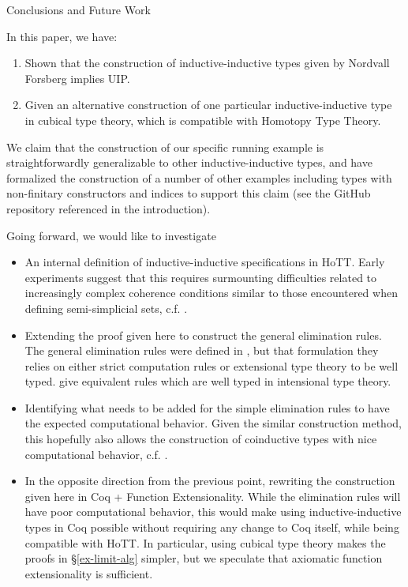 \documentclass[runningheads]{llncs}
\def\Forsberg/{Nordvall Forsberg}
\begin{document}
\begin{section}{Conclusions and Future Work}

In this paper, we have:
\begin{enumerate}
    \item Shown that the construction of inductive-inductive types given by \Forsberg/ implies UIP.
    \item Given an alternative construction of one particular inductive-inductive type in cubical type theory, which is compatible with Homotopy Type Theory.
\end{enumerate}

We claim that the construction of our specific running example is straightforwardly generalizable to other inductive-inductive types, and have formalized the construction of a number of other examples including types with non-finitary constructors and indices to support this claim (see the GitHub repository referenced in the introduction).

Going forward, we would like to investigate
\begin{itemize}
    \item An internal definition of inductive-inductive specifications in HoTT. Early experiments suggest that this requires surmounting difficulties related to increasingly complex coherence conditions similar to those encountered when defining semi-simplicial sets, c.f. \citet{simplicialsets}.
    \item Extending the proof given here to construct the general elimination rules. The general elimination rules were defined in \citet{nordvallforsberg2013thesis}, but that formulation they relies on either strict computation rules or extensional type theory to be well typed. \citet{KaposiKovacsHIITsyntax} give equivalent rules which are well typed in intensional type theory.
    \item Identifying what needs to be added for the simple elimination rules to have the expected computational behavior. Given the similar construction method, this hopefully also allows the construction of coinductive types with nice computational behavior, c.f. \citet{nonwellfoundedtrees}.
    \item In the opposite direction from the previous point, rewriting the construction given here in Coq + Function Extensionality. While the elimination rules will have poor computational behavior, this would make using inductive-inductive types in Coq possible without requiring any change to Coq itself, while being compatible with HoTT. In particular, using cubical type theory makes the proofs in \S\ref{ex-limit-alg} simpler, but we speculate that axiomatic function extensionality is sufficient.
\end{itemize}

\end{section}
\end{document}
